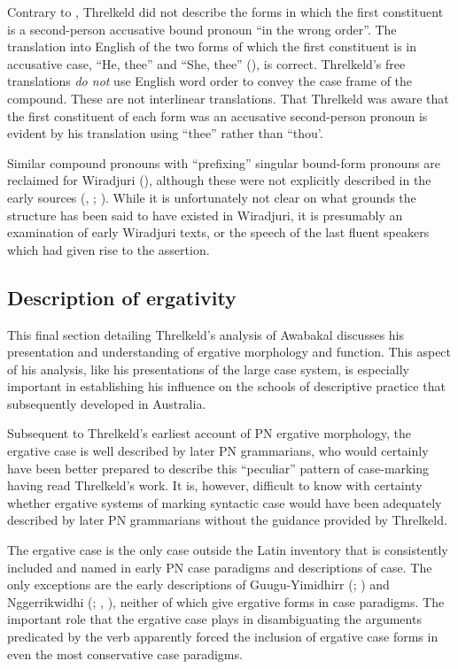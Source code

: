 Contrary to \citet[48]{lissarrague_salvage_2006}, Threlkeld did not describe the forms in which the first constituent is a second-person accusative bound pronoun “in the wrong order”. The translation into English of the two forms of which the first constituent is in accusative case, “He, thee” and “She, thee” (), is correct. Threlkeld’s free translations \textit{do not} use English word order to convey the case frame of the compound. These are not interlinear translations. That Threlkeld was aware that the first constituent of each form was an accusative second-person pronoun is evident by his translation using “thee” rather than “thou’.

Similar compound pronouns with “prefixing” singular bound-form pronouns are reclaimed for Wiradjuri (\citealt[51--54]{grant_grammar_2014}), although these were not explicitly described in the early sources (\citealt{gunther_native_1838}, \citeyear{gunther_lecture_1840}; \citealt{hale_languages_1846}). While it is unfortunately not clear on what grounds the structure has been said to have existed in Wiradjuri, it is presumably an examination of early Wiradjuri texts, or the speech of the last fluent speakers which had given rise to the assertion.

\subsection{Description of ergativity }
\label{sec:key:3.3.7}

This final section detailing Threlkeld’s analysis of Awabakal discusses his presentation and understanding of ergative morphology and function. This aspect of his analysis, like his presentations of the large case system, is especially important in establishing his influence on the schools of descriptive practice that subsequently developed in Australia. 

Subsequent to Threlkeld’s earliest account of PN ergative morphology, the ergative case is well described by later PN grammarians, who would certainly have been better prepared to describe this “peculiar” pattern of case-marking having read Threlkeld’s work. It is, however, difficult to know with certainty whether ergative systems of marking syntactic case would have been adequately described by later PN grammarians without the guidance provided by Threlkeld.

The ergative case is the only case outside the Latin inventory that is consistently included and named in early PN case paradigms and descriptions of case. The only exceptions are the early descriptions of Guugu-Yimidhirr (\citealt{schwarz_koko_1900}; \citealt{roth_structure_1901}) and Nggerrikwidhi (\citealt{hey_elementary_1903}; , ), neither of which give ergative forms in case paradigms. The important role that the ergative case plays in disambiguating the arguments predicated by the verb apparently forced the inclusion of ergative case forms in even the most conservative case paradigms.

